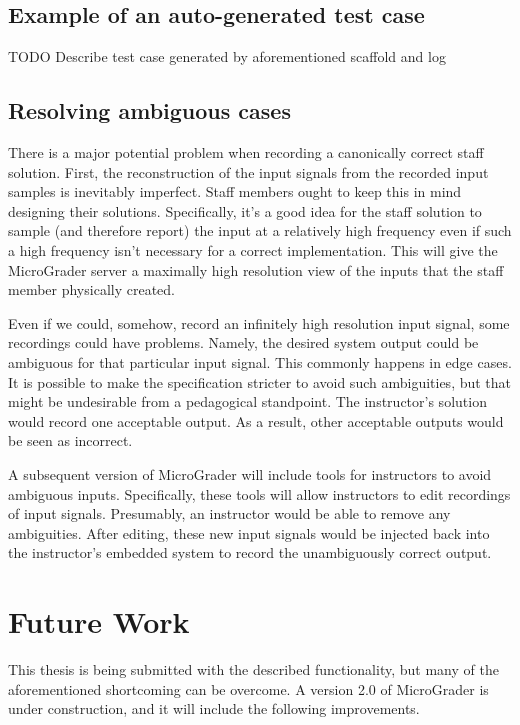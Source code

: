 \documentclass[12pt]{article}
\begin{document}
\subsection{Example of an auto-generated test case}
TODO Describe test case generated by aforementioned scaffold and log

\subsection{Resolving ambiguous cases}
\label{sec:resolve-amiguity}
There is a major potential problem when recording a canonically correct staff solution.  First, the reconstruction of the input signals from the recorded input samples is inevitably imperfect.  Staff members ought to keep this in mind designing their solutions.  Specifically, it's a good idea for the staff solution to sample (and therefore report) the input at a relatively high frequency even if such a high frequency isn't necessary for a correct implementation.  This will give the MicroGrader server a maximally high resolution view of the inputs that the staff member physically created.

Even if we could, somehow, record an infinitely high resolution input signal, some recordings could have problems.  Namely, the desired system output could be ambiguous for that particular input signal.  This commonly happens in edge cases.  It is possible to make the specification stricter to avoid such ambiguities, but that might be undesirable from a pedagogical standpoint.  The instructor's solution would record one acceptable output.  As a result, other acceptable outputs would be seen as incorrect.

A subsequent version of MicroGrader will include tools for instructors to avoid ambiguous inputs.  Specifically, these tools will allow instructors to edit recordings of input signals.  Presumably, an instructor would be able to remove any ambiguities.  After editing, these new input signals would be injected back into the instructor's embedded system to record the unambiguously correct output.


\newpage
\section{Future Work}
This thesis is being submitted with the described functionality, but many of the aforementioned shortcoming can be overcome.  A version 2.0 of MicroGrader is under construction, and it will include the following improvements.
\end{document}
